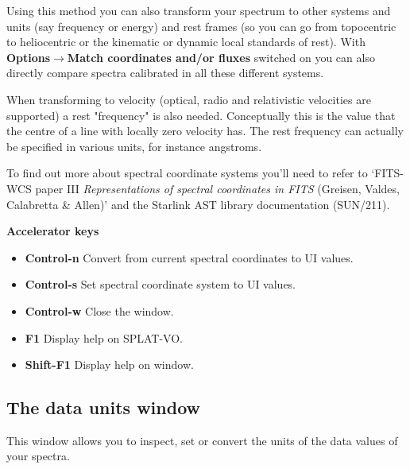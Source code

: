 \documentclass[twoside,11pt]{article}
\newcommand{\latexhtml}[2]{#1}
\newcommand{\xref}[3]{#1}
\renewcommand{\_}{\texttt{\symbol{95}}}
\newcommand{\SPLAT}{\textsf{SPLAT-VO}}
\newcommand{\submenuitem}[2]{\latexhtml{\textbf{#1$\rightarrow$#2}}{\textbf{#1->#2}}}
\newcommand{\labelitem}[1]{\textbf{#1}}
\newcommand{\subheading}[1]{\textbf{\large{#1}}}
\begin{document}
Using this method you can also transform your spectrum to other systems and
units (say frequency or energy) and rest frames (so you can go from
topocentric to heliocentric or the kinematic or dynamic local standards of
rest). With \submenuitem{Options}{Match coordinates and/or fluxes} switched on
you can also directly compare spectra calibrated in all these different
systems.

When transforming to velocity (optical, radio and relativistic velocities are
supported) a rest "frequency" is also needed.  Conceptually this is the value
that the centre of a line with locally zero velocity has. The rest frequency
can actually be specified in various units, for instance angstroms.

To find out more about spectral coordinate systems you'll need to refer to
`FITS-WCS paper III
\textit{Representations of spectral coordinates in FITS}
(Greisen, Valdes, Calabretta \& Allen)' and the Starlink AST library
documentation (\xref{SUN/211}{sun211}{ss_specframes}).

\subheading{Accelerator keys}

\begin{itemize}
\item \labelitem{Control-n} Convert from current spectral coordinates to UI values.
\item \labelitem{Control-s} Set spectral coordinate system to UI values.
\item \labelitem{Control-w} Close the window.
\item \labelitem{F1} Display help on \SPLAT.     
\item \labelitem{Shift-F1} Display help on window.
\end{itemize}

\newpage
\subsection{The data units window}

This window allows you to inspect, set or convert the units of the data values
of your spectra.
\end{document}
